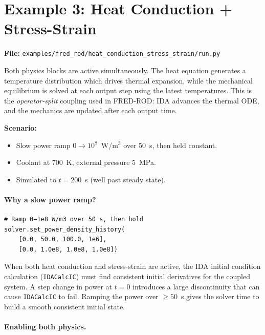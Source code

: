 \documentclass[11pt,a4paper]{article}
\begin{document}
\section{Example 3: Heat Conduction + Stress-Strain}
\label{sec:hcss}

\textbf{File:} \texttt{examples/fred\_rod/heat\_conduction\_stress\_strain/run.py}

\medskip
Both physics blocks are active simultaneously.  The heat equation generates
a temperature distribution which drives thermal expansion, while the
mechanical equilibrium is solved at each output step using the latest
temperatures.  This is the \emph{operator-split} coupling used in FRED-ROD:
IDA advances the thermal ODE, and the mechanics are updated after each output
time.

\textbf{Scenario:}
\begin{itemize}
  \item Slow power ramp $0 \to 10^8$~W/m$^3$ over 50~s, then held constant.
  \item Coolant at 700~K, external pressure 5~MPa.
  \item Simulated to $t = 200$~s (well past steady state).
\end{itemize}

\paragraph{Why a slow power ramp?}

\begin{lstlisting}
# Ramp 0→1e8 W/m3 over 50 s, then hold
solver.set_power_density_history(
    [0.0, 50.0, 100.0, 1e6],
    [0.0, 1.0e8, 1.0e8, 1.0e8])
\end{lstlisting}

When both heat conduction and stress-strain are active, the IDA initial
condition calculation (\texttt{IDACalcIC}) must find consistent initial
derivatives for the coupled system.  A step change in power at $t=0$
introduces a large discontinuity that can cause \texttt{IDACalcIC} to fail.
Ramping the power over $\ge 50$~s gives the solver time to build a smooth
consistent initial state.

\paragraph{Enabling both physics.}
\end{document}
